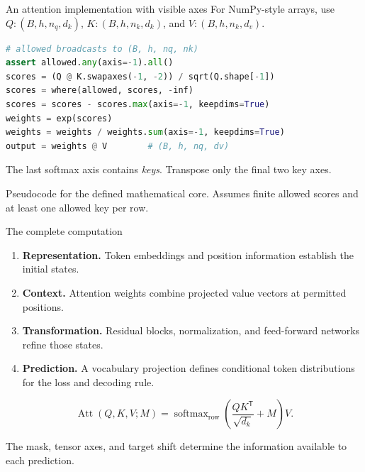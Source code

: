 \documentclass[aspectratio=169,11pt]{beamer}
\newcommand{\T}{\mathsf{T}}
\newcommand{\src}[1]{\par\vfill{\fontsize{7}{8.5}\selectfont\color{muted}#1}\par}
\DeclareMathOperator{\softmax}{softmax}
\DeclareMathOperator{\Att}{Att}
\begin{document}
\begin{frame}[t,fragile]{An attention implementation with visible axes}
For NumPy-style arrays, use $Q:(B,h,n_q,d_k)$,
$K:(B,h,n_k,d_k)$, and $V:(B,h,n_k,d_v)$.
\begin{lstlisting}[language=Python]
# allowed broadcasts to (B, h, nq, nk)
assert allowed.any(axis=-1).all()
scores = (Q @ K.swapaxes(-1, -2)) / sqrt(Q.shape[-1])
scores = where(allowed, scores, -inf)
scores = scores - scores.max(axis=-1, keepdims=True)
weights = exp(scores)
weights = weights / weights.sum(axis=-1, keepdims=True)
output = weights @ V        # (B, h, nq, dv)
\end{lstlisting}
The last softmax axis contains \emph{keys}. Transpose only the final two key axes.
\src{Pseudocode for the defined mathematical core. Assumes finite allowed scores and at least one allowed key per row.}
\end{frame}

\begin{frame}[t]{The complete computation}
\begin{enumerate}
  \item \textbf{Representation.} Token embeddings and position information
        establish the initial states.
  \item \textbf{Context.} Attention weights combine projected value vectors
        at permitted positions.
  \item \textbf{Transformation.} Residual blocks, normalization, and
        feed-forward networks refine those states.
  \item \textbf{Prediction.} A vocabulary projection defines conditional
        token distributions for the loss and decoding rule.
\end{enumerate}
\vspace{2mm}
\[
 \Att(Q,K,V;M)=\softmax_{\mathrm{row}}
       \!\left(\frac{QK^{\T}}{\sqrt{d_k}}+M\right)V.
\]
\src{The mask, tensor axes, and target shift determine the information available to each prediction.}
\end{frame}
\end{document}
